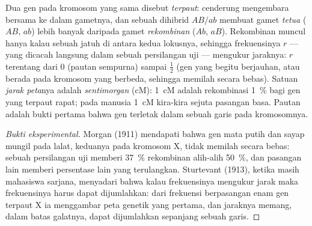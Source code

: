 \begin{definition}\label{def:b2:meiosis-heredity:linkage}
Dua gen pada kromosom yang sama disebut \emph{terpaut}: 
cenderung mengembara bersama ke dalam gametnya, dan sebuah dihibrid
$AB/ab$ membuat gamet \emph{tetua} ($AB$, $ab$) lebih banyak daripada
gamet \emph{rekombinan} ($Ab$, $aB$). Rekombinan muncul hanya kalau
sebuah  jatuh di antara kedua lokusnya, sehingga
frekuensinya $r$ --- yang dicacah langsung dalam sebuah persilangan uji
--- mengukur jaraknya: $r$ terentang dari 0 (pautan sempurna) sampai
$\tfrac12$ (gen yang begitu berjauhan, atau berada pada kromosom yang
berbeda, sehingga memilah secara bebas). Satuan \emph{jarak peta}nya
adalah \emph{sentimorgan} (cM): \qty{1}{cM} adalah rekombinasi
\qty{1}{\%} bagi gen yang terpaut rapat; pada manusia \qty{1}{cM}
kira-kira sejuta pasangan basa. Pautan adalah bukti pertama bahwa gen
terletak dalam sebuah garis pada kromosomnya.
\end{definition}
\begin{proof}[Bukti eksperimental]
Morgan (1911) mendapati bahwa gen mata putih dan sayap mungil pada
lalat, keduanya pada kromosom X, tidak memilah secara bebas: sebuah
persilangan uji memberi \qty{37}{\%} rekombinan alih-alih \qty{50}{\%},
dan pasangan lain memberi persentase lain yang terulangkan. Sturtevant
(1913), ketika masih mahasiswa sarjana, menyadari bahwa kalau
frekuensinya mengukur jarak maka frekuensinya harus dapat dijumlahkan:
dari frekuensi berpasangan enam gen terpaut X ia menggambar peta
genetik yang pertama, dan jaraknya memang, dalam batas galatnya, dapat
dijumlahkan sepanjang sebuah garis.
\end{proof}

